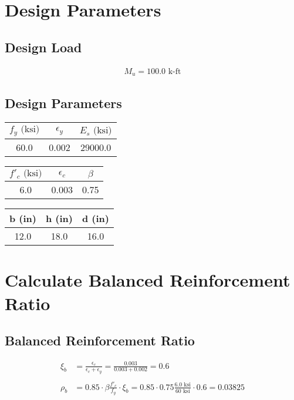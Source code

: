 \documentclass{article}%
\begin{document}
%
\normalsize%
\section{Design Parameters}%
\label{sec:Design Parameters}%
\subsection{Design Load}%
\label{subsec:Design Load}%
\begin{align*} M_u = 100.0 \text{ k-ft}\end{align*}

%
\subsection{Design Parameters}%
\label{subsec:Design Parameters}%
\begin{center}
%
\begin{tabular}{ccc}
\toprule
 $f_y\text{ (ksi)}$ &  $\epsilon_y$ &  $E_s\text{ (ksi)}$ \\
\midrule
               60.0 &         0.002 &             29000.0 \\
\bottomrule
\end{tabular}
%
\end{center}%
\begin{center}
%
\begin{tabular}{ccc}
\toprule
 $f'_c\text{ (ksi)}$ &  $\epsilon_c$ &  $\beta$ \\
\midrule
                 6.0 &         0.003 &     0.75 \\
\bottomrule
\end{tabular}
%
\end{center}%
\begin{center}
%
\begin{tabular}{ccc}
\toprule
 b (in) &  h (in) &  d (in) \\
\midrule
   12.0 &    18.0 &    16.0 \\
\bottomrule
\end{tabular}
%
\end{center}

%
\section{Calculate Balanced Reinforcement Ratio}%
\label{sec:Calculate Balanced Reinforcement Ratio}%
\subsection{Balanced Reinforcement Ratio}%
\label{subsec:Balanced Reinforcement Ratio}%
\begin{align*}\xi_{b} &= \frac{\epsilon_c}{\epsilon_c + \epsilon_y} =\frac{0.003}{0.003 + 0.002} = 0.6 \\\\ \rho_{b} &= 0.85 \cdot \beta \frac{f'_c}{f_y} \cdot \xi_b= 0.85 \cdot 0.75 \frac{6.0 \text{ ksi}}{60 \text{ ksi}} \cdot 0.6 = 0.03825 \end{align*}
\end{document}
